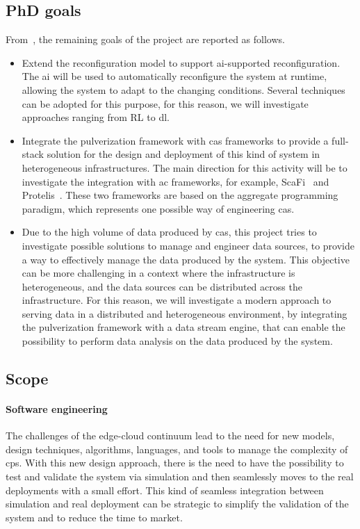 \documentclass[12pt]{article}
\begin{document}
\subsection{PhD goals}\label{subsec:phd-activities}

From~,
the remaining goals of the project are reported as follows.

\begin{itemize}
	\item Extend the reconfiguration model to support \ac{ai}-supported reconfiguration.
		The \ac{ai} will be used to automatically reconfigure the system at runtime,
		allowing the system to adapt to the changing conditions.
		Several techniques can be adopted for this purpose,
		for this reason,
		we will investigate approaches ranging from RL to \ac{dl}.
	\item Integrate the pulverization framework with \ac{cas} frameworks to provide a full-stack solution for the design and deployment of this kind of system in heterogeneous infrastructures.
		The main direction for this activity will be to investigate the integration with \ac{ac} frameworks,
		for example,
		ScaFi~\cite{DBLP:journals/softx/CasadeiVAP22} and Protelis~\cite{DBLP:conf/sac/PianiniVB15}.
		These two frameworks are based on the aggregate programming paradigm,
		which represents one possible way of engineering \ac{cas}.
	\item Due to the high volume of data produced by \ac{cas},
		this project tries to investigate possible solutions to manage and engineer data sources,
		to provide a way to effectively manage the data produced by the system.
		This objective can be more challenging in a context where the infrastructure is heterogeneous,
		and the data sources can be distributed across the infrastructure.
		For this reason,
		we will investigate a modern approach to serving data in a distributed and heterogeneous environment,
		by integrating the pulverization framework with a data stream engine,
		that can enable the possibility to perform data analysis on the data produced by the system.
\end{itemize}

\subsection{Scope}\label{subsec:scope}

\paragraph{Software engineering}
The challenges of the edge-cloud continuum lead to the need for new models,
design techniques, algorithms, languages, and tools to manage the complexity
of \ac{cps}.
%
With this new design approach,
there is the need to have the possibility to test and validate the system via simulation
and then seamlessly moves to the real deployments with a small effort.
%
This kind of seamless integration between simulation and real deployment can be strategic
to simplify the validation of the system and to reduce the time to market.
\end{document}
